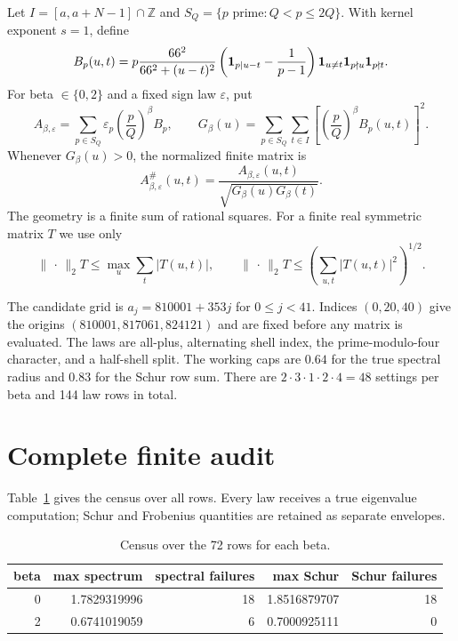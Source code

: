 \documentclass[10pt]{article}
\newcommand{\opnorm}{\lVert\,\cdot\,\rVert_2}
\begin{document}
Let $I=[a,a+N-1]\cap\mathbb Z$ and
$S_Q=\{p\text{ prime}:Q<p\leq2Q\}$.  With kernel exponent $s=1$, define
\begin{equation}
B_p(u,t)=p\frac{66^2}{66^2+(u-t)^2}
 \left({\bf1}_{p\mid u-t}-\frac1{p-1}\right)
 \mathbf 1_{u\ne t}\mathbf 1_{p\nmid u}\mathbf 1_{p\nmid t}.
\label{eq:block}
\end{equation}
For beta $\in\{0,2\}$ and a fixed sign law $\varepsilon$, put
\begin{equation}
A_{\beta,\varepsilon}=\sum_{p\in S_Q}\varepsilon_p
 \left(\frac pQ\right)^\beta B_p,\qquad
G_\beta(u)=\sum_{p\in S_Q}\sum_{t\in I}
 \left[\left(\frac pQ\right)^\beta B_p(u,t)\right]^2.
\label{eq:weighted}
\end{equation}
Whenever $G_\beta(u)>0$, the normalized finite matrix is
\begin{equation}
A_{\beta,\varepsilon}^{\#}(u,t)=
\frac{A_{\beta,\varepsilon}(u,t)}
 {\sqrt{G_\beta(u)G_\beta(t)}}.
\label{eq:norm}
\end{equation}
The geometry is a finite sum of rational squares.  For a finite real
symmetric matrix $T$ we use only
\begin{equation}
\opnorm{T}\leq\max_u\sum_t|T(u,t)|,
\qquad
\opnorm{T}\leq\left(\sum_{u,t}|T(u,t)|^2\right)^{1/2}.
\label{eq:envelopes}
\end{equation}

The candidate grid is $a_j=810001+353j$ for $0\leq j<41$.  Indices
$(0,20,40)$ give the origins $(810001,817061,824121)$ and are fixed before
any matrix is evaluated.  The laws are all-plus, alternating shell index,
the prime-modulo-four character, and a half-shell split.  The working caps
are $0.64$ for the true spectral radius and $0.83$ for the Schur row sum.
There are $2\cdot3\cdot1\cdot2\cdot4=48$ settings per beta and 144 law
rows in total.

\section{Complete finite audit}

Table~\ref{tab:beta} gives the census over all rows.  Every law receives a
true eigenvalue computation; Schur and Frobenius quantities are retained as
separate envelopes.

\begin{table}[t]
\centering
\caption{Census over the 72 rows for each beta.}
\label{tab:beta}
\small
\begin{tabular}{r r r r r}
\toprule
beta & max spectrum & spectral failures & max Schur & Schur failures\\
\midrule
0 & 1.7829319996 & 18 & 1.8516879707 & 18\\
2 & 0.6741019059 & 6 & 0.7000925111 & 0\\
\bottomrule
\end{tabular}
\end{table}
\end{document}
